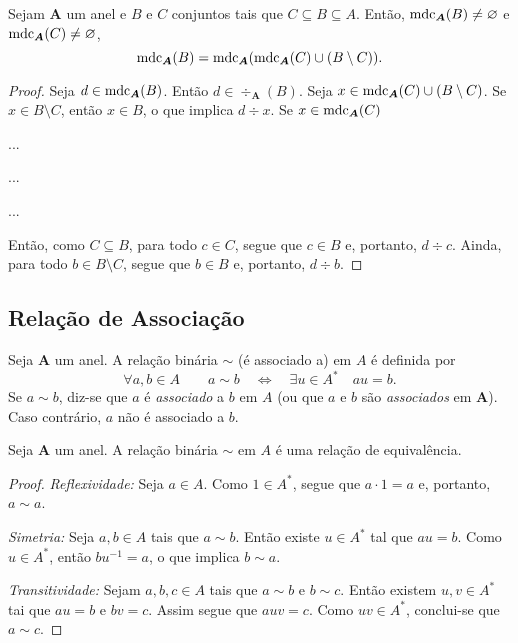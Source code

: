 \begin{prop}
	Sejam $\bm A$ um anel e $B$ e $C$ conjuntos tais que $C \subseteq B \subseteq A$. Então, $\operatorname{mdc}_{\bm A}(B) \neq \varnothing$ e $\operatorname{mdc}_{\bm A}(C) \neq \varnothing$,
	\begin{equation*}
	\operatorname{mdc}_{\bm A}(B) = \operatorname{mdc}_{\bm A}(\operatorname{mdc}_{\bm A}(C) \cup (B \setminus C)).
	\end{equation*}
\end{prop}
\begin{proof}
	Seja $d \in \operatorname{mdc}_{\bm A}(B)$. Então $d \in \div_{\bm A}(B)$. Seja $x \in \operatorname{mdc}_{\bm A}(C) \cup (B \setminus C)$. Se $x \in B \setminus C$, então $x \in B$, o que implica $d \div x$. Se $x \in \operatorname{mdc}_{\bm A}(C)$

	...

	...

	...




	Então, como $C \subseteq B$, para todo $c \in C$, segue que $c \in B$ e, portanto, $d \div c$. Ainda, para todo $b \in B \setminus C$, segue que $b \in B$ e, portanto, $d \div b$.



\end{proof}









\subsection{Relação de Associação}

\begin{defi}
	Seja $\bm A$ um anel. A relação binária $\sim$ (é associado a) em $A$ é definida por
	\begin{equation*}
	\forall a,b \in A \qquad a \sim b \quad \Leftrightarrow \quad \exists u \in A^* \quad au=b.
	\end{equation*}
	Se $a \sim b$, diz-se que $a$ é \emph{associado} a $b$ em $A$ (ou que $a$ e $b$ são \emph{associados} em $\bm A$). Caso contrário, $a$ não é associado a $b$.
\end{defi}

\begin{prop}
	Seja $\bm A$ um anel. A relação binária $\sim$ em $A$ é uma relação de equivalência.
\end{prop}
\begin{proof}
	\emph{Reflexividade:} Seja $a \in A$. Como $1 \in A^*$, segue que $a\cdot 1=a$ e, portanto, $a \sim a$.

	\emph{Simetria:} Seja $a,b \in A$ tais que $a \sim b$. Então existe $u \in A^*$ tal que $au = b$. Como $u \in A^*$, então $bu^{-1} = a$, o que implica $b \sim a$.

	\emph{Transitividade:} Sejam $a,b,c \in A$ tais que $a \sim b$ e $b \sim c$. Então existem $u,v \in A^*$ tai que $au=b$ e $bv=c$. Assim segue que $auv=c$. Como $uv \in A^*$, conclui-se que $a \sim c$.
\end{proof}

